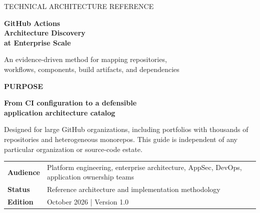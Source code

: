 \documentclass[11pt,letterpaper]{article}
\newcommand{\eyebrow}[1]{{\sffamily\bfseries\small\color{Teal}\MakeUppercase{#1}}}
\begin{document}
\thispagestyle{empty}
\vspace*{0.86in}
{\color{white}\sffamily\fontsize{12}{16}\selectfont TECHNICAL ARCHITECTURE REFERENCE}\par
\vspace{0.28in}
{\color{white}\sffamily\bfseries\fontsize{28}{34}\selectfont GitHub Actions\\[3pt] Architecture Discovery\\[3pt] at Enterprise Scale}\par
\vspace{0.26in}
{\color{white}\fontsize{13}{19}\selectfont An evidence-driven method for mapping repositories,\\ workflows, components, build artifacts, and dependencies}\par
\vspace{1.36in}
\eyebrow{Purpose}\par
\vspace{7pt}
{\Large\bfseries\color{Navy} From CI configuration to a defensible\\ application architecture catalog}\par
\vspace{14pt}
{\color{BlueGray}Designed for large GitHub organizations, including portfolios with thousands of repositories and heterogeneous monorepos. This guide is independent of any particular organization or source-code estate.}\par
\vfill
\begin{tabularx}{\linewidth}{@{}P{1.15in}Y@{}}
\color{BlueGray}\textbf{Audience} & Platform engineering, enterprise architecture, AppSec, DevOps, application ownership teams \\
\color{BlueGray}\textbf{Status} & Reference architecture and implementation methodology \\
\color{BlueGray}\textbf{Edition} & October 2026 \quad | \quad Version 1.0 \\
\end{tabularx}
\newpage
\end{document}
